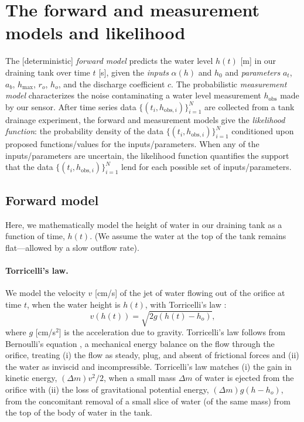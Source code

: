 \documentclass[openacc]{rsproca_new}%
\newcommand\thedata {$\{(t_i,h_{\text{obs}, i})\}_{i=1}^{N}$\xspace}
\begin{document}
\section{The forward and measurement models and likelihood} \label{sec:forward_model}
The [deterministic] \emph{forward model} predicts the water level $h(t)$ [m] in our draining tank over time $t$ [s], given the \emph{inputs} $\alpha(h)$ and $h_0$ and \emph{parameters} $a_t$, $a_b$, $h_{\text{max}}$, $r_o$, $h_o$, and the discharge coefficient $c$. 
The probabilistic \emph{measurement model} characterizes the noise contaminating a water level measurement $h_{\text{obs}}$ made by our sensor.
After time series data \thedata are collected from a tank drainage experiment, the forward and measurement models give the \emph{likelihood function}: the probability density of the data \thedata conditioned upon proposed functions/values for the inputs/parameters. 
When any of the inputs/parameters are uncertain, the likelihood function quantifies the support that the data \thedata lend for each possible set of inputs/parameters.

\subsection{Forward model}
Here, we mathematically model the height of water in our draining tank as a function of time, $h(t)$. (We assume the water at the top of the tank remains flat---allowed by a slow outflow rate). 


\paragraph{Torricelli's law.}
We model the velocity $v$ [cm/s] of the jet of water flowing out of the orifice at time $t$, when the water height is $h(t)$, with Torricelli's law \cite{d2021torricelli}:
\begin{equation}
	v(h(t)) =  \sqrt{2 g(h(t)-h_o)}, \label{eq:Torricelli}
\end{equation} where $g$ [cm/s$^2$] is the acceleration due to gravity. Torricelli's law follows from Bernoulli's equation \cite{welty2020fundamentals}, a mechanical energy balance on the flow through the orifice, treating (i) the flow as steady, plug, and absent of frictional forces and (ii) the water as inviscid and incompressible.
Torricelli's law matches (i) the gain in kinetic energy, $(\Delta m) v^2/2$, when a small mass $\Delta m$ of water is ejected from the orifice with (ii) the loss of gravitational potential energy, $(\Delta m)g(h-h_o)$, from the concomitant removal of a small slice of water (of the same mass) from the top of the body of water in the tank. \cite{groetsch1993inverse,driver1998torricelli,williams2021vessel}
\end{document}
